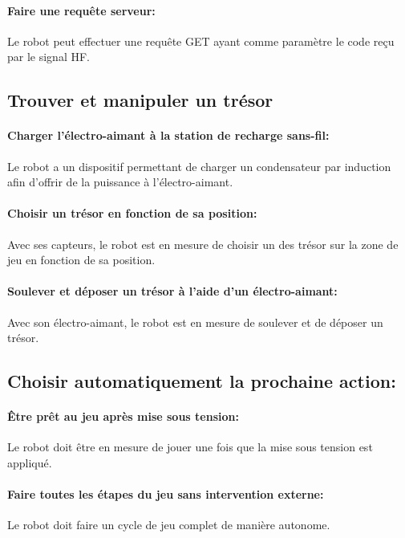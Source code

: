 \paragraph{Faire une requête serveur:}
Le robot peut effectuer une requête GET ayant comme paramètre le code reçu par le signal HF.

\subsection{Trouver et manipuler un trésor}

\paragraph{Charger l'électro-aimant à la station de recharge sans-fil:}
Le robot a un dispositif permettant de charger un condensateur par induction afin d'offrir de la puissance à l'électro-aimant.

\paragraph{Choisir un trésor en fonction de sa position:}
Avec ses capteurs, le robot est en mesure de choisir un des trésor sur la zone de jeu en fonction de sa position.

\paragraph{Soulever et déposer un trésor à l'aide d'un électro-aimant:}
Avec son électro-aimant, le robot est en mesure de soulever et de déposer un trésor.

\subsection{Choisir automatiquement la prochaine action:}

\paragraph{Être prêt au jeu après mise sous tension:}
Le robot doit être en mesure de jouer une fois que la mise sous tension est appliqué.

\paragraph{Faire toutes les étapes du jeu sans intervention externe:}
Le robot doit faire un cycle de jeu complet de manière autonome.

